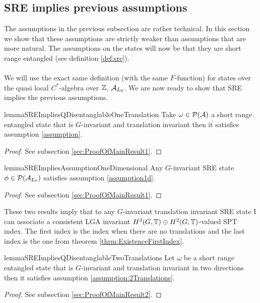 \documentclass[12pt,a4paper,twoside]{article}
\numberwithin{equation}{section}
\begin{document}
\subsection{SRE implies previous assumptions}\label{sec:Results_1}
The assumptions in the previous subsection are rather technical. In this section we show that these assumptions are strictly weaker than assumptions that are more natural. The assumptions on the states will now be that they are short range entangled (see definition \ref{def:sre}).\\\\
We will use the exact same definition (with the same $F$-function) for states over the quasi local $C^*$-algebra over $\ZZ$, $\AA_{L_0}$. We are now ready to show that SRE implies the previous assumptions.
\begin{restatable}{lemma}{SREImpliesQDisentanglableOneTranslation}\label{lem:SRE_Implies_QDisentanglable_OneTranslation}
	Take $\omega\in\PP(\AA)$ a short range entangled state that is $G$-invariant and translation invariant then it satisfies assumption \ref{assumption}.
\end{restatable}
\begin{proof}
	See subsection \ref{sec:ProofOfMainResult1}.
\end{proof}
\begin{restatable}{lemma}{SREImpliesAssumptionOneDimensional}\label{lem:SRE_Implies_Assumption_1d}
	Any $G$-invariant SRE state $\phi\in\PP(\AA_{L_0})$ satisfies assumption \ref{assumption1d}.
\end{restatable}
\begin{proof}
	See subsection \ref{sec:ProofOfMainResult1}.
\end{proof}
These two results imply that to any $G$-invariant translation invariant SRE state I can associate a consistent LGA invariant $H^3(G,\TT)\oplus H^2(G,\TT)$-valued SPT index. The first index is the index when there are no translations and the last index is the one from theorem \ref{thrm:ExistenceFirstIndex}.
\begin{restatable}{lemma}{SREImpliesQDisentanglableTwoTranslations}\label{lem:SRE_Implies_QDisentanglable_TwoTranslations}
	Let $\omega$ be a short range entangled state that is $G$-invariant and translation invariant in two directions then it satisfies assumption \ref{assumption:2Translations}.
\end{restatable}
\begin{proof}
	See subsection \ref{sec:ProofOfMainResult2}.
\end{proof}
\end{document}
